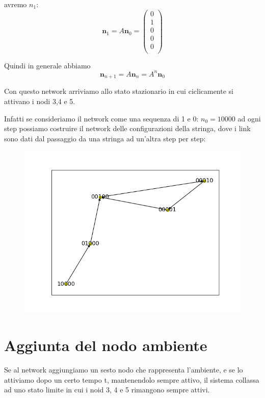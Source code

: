 \documentclass[11pt]{article}
\begin{document}
avremo $n_1$:
$$
\textbf{n}_1= A \textbf{n}_0 = \left ( 
\begin{array}{c}
0 \\
1 \\
0 \\
0 \\
0 \\
\end{array}
\right ) 
$$

Quindi in generale abbiamo 
$$
\textbf{n}_{n+1}= A \textbf{n}_n = A^n \textbf{n}_0
$$

Con questo network arriviamo allo stato stazionario in cui ciclicamente si attivano i nodi 3,4 e 5.

Infatti se consideriamo il network come una sequenza di 1 e 0: $n_0 = 10000$ ad ogni step possiamo costruire il network delle configurazioni della stringa, dove i link
sono dati dal passaggio da una stringa ad un'altra step per step:
\begin{figure}[ht!]
  \center
  \includegraphics[scale=0.5]{confi.png}
  \label{fig:net}
\end{figure}


\section{Aggiunta del nodo ambiente}
Se al network aggiungiamo un sesto nodo che rappresenta l'ambiente, e se lo attiviamo dopo un certo tempo t, mantenendolo sempre attivo,  il sistema collassa ad uno stato limite in cui i noid 3, 4 e 5 rimangono sempre attivi.
\end{document}
